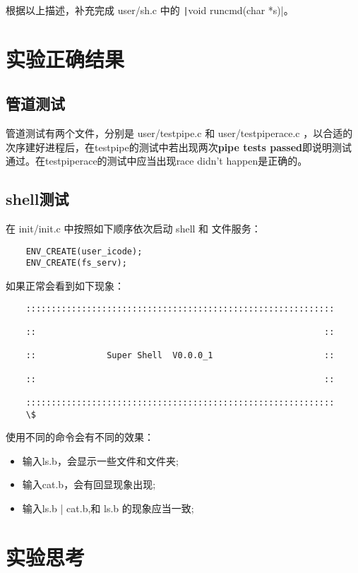 \begin{exercise}
	根据以上描述，补充完成 user/sh.c 中的 \texttt|void runcmd(char *s)|。
\end{exercise}

\section{实验正确结果}

\subsection{管道测试}
管道测试有两个文件，分别是 user/testpipe.c 和 user/testpiperace.c ，以合适的次序建好进程后，在testpipe的测试中若出现两次\textbf{pipe tests passed}即说明测试通过。在testpiperace的测试中应当出现{race didn't happen}是正确的。

\subsection{shell测试}
在 init/init.c 中按照如下顺序依次启动 shell 和 文件服务：

\begin{verbatim}
	ENV_CREATE(user_icode);
	ENV_CREATE(fs_serv);
\end{verbatim}

如果正常会看到如下现象：

\begin{verbatim}
	:::::::::::::::::::::::::::::::::::::::::::::::::::::::::::::
	
	::                                                         ::
	
	::              Super Shell  V0.0.0_1                      ::
	
	::                                                         ::
	
	:::::::::::::::::::::::::::::::::::::::::::::::::::::::::::::
	\$
\end{verbatim}

使用不同的命令会有不同的效果：
\begin{itemize}
	\item 输入ls.b，会显示一些文件和文件夹;
	\item 输入cat.b，会有回显现象出现;
	\item 输入ls.b | cat.b,和 ls.b 的现象应当一致;
\end{itemize}

\section{实验思考}


